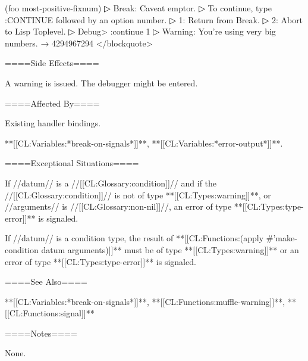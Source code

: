 (foo most-positive-fixnum)
▷ Break: Caveat emptor.
▷ To continue, type :CONTINUE followed by an option number.
▷ 1: Return from Break.
▷ 2: Abort to Lisp Toplevel.
▷ Debug> :continue 1
▷ Warning: You're using very big numbers. → 4294967294 </blockquote>

====Side Effects====

A warning is issued. The debugger might be entered.

====Affected By====

Existing handler bindings.

**[[CL:Variables:*break-on-signals*]]**, **[[CL:Variables:*error-output*]]**.

====Exceptional Situations====

If //datum// is a //[[CL:Glossary:condition]]// and if the //[[CL:Glossary:condition]]// is not of type **[[CL:Types:warning]]**, or //arguments// is //[[CL:Glossary:non-nil]]//, an error of type **[[CL:Types:type-error]]** is signaled.

If //datum// is a condition type, the result of **[[CL:Functions:(apply #'make-condition datum arguments)]]** must be of type **[[CL:Types:warning]]** or an error of type **[[CL:Types:type-error]]** is signaled.

====See Also====

**[[CL:Variables:*break-on-signals*]]**, **[[CL:Functions:muffle-warning]]**, **[[CL:Functions:signal]]**

====Notes====

None.

